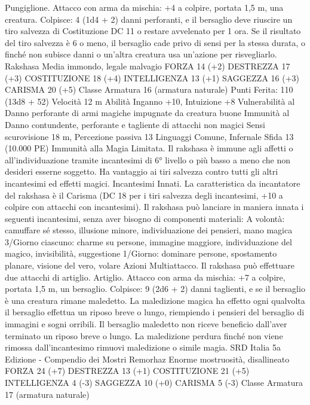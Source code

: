 \begin{multicols}{2}
Pungiglione. Attacco con arma da mischia: +4 a colpire, portata
1,5 m, una creatura.
Colpisce: 4 (1d4 + 2) danni perforanti, e il bersaglio deve
riuscire un tiro salvezza di Costituzione DC 11 o restare
avvelenato per 1 ora. Se il risultato del tiro salvezza è 6 o meno,
il bersaglio cade privo di sensi per la stessa durata, o finché non
subisce danni o un’altra creatura usa un’azione per risvegliarlo.
Rakshasa
Media immondo, legale malvagio
FORZA 14 (+2)
DESTREZZA 17 (+3)
COSTITUZIONE 18 (+4)
INTELLIGENZA 13 (+1)
SAGGEZZA 16 (+3)
CARISMA 20 (+5)
Classe Armatura 16 (armatura naturale)
\hspace*{0pt}\hfill{Punti Ferita}: 110 (13d8 + 52)
Velocità 12 m
Abilità Inganno +10, Intuizione +8
Vulnerabilità al Danno perforante di armi magiche impugnate
da creatura buone
Immunità al Danno contundente, perforante e tagliente di
attacchi non magici
Sensi scurovisione 18 m, Percezione passiva 13
Linguaggi Comune, Infernale
Sfida 13 (10.000 PE)
Immunità alla Magia Limitata. Il rakshasa è immune agli affetti
o all’individuazione tramite incantesimi di 6° livello o più basso
a meno che non desideri esserne soggetto. Ha vantaggio ai tiri
salvezza contro tutti gli altri incantesimi ed effetti magici.
Incantesimi Innati. La caratteristica da incantatore del rakshasa
è il Carisma (DC 18 per i tiri salvezza degli incantesimi, +10 a
colpire con attacchi con incantesimi). Il rakshasa può lanciare in
maniera innata i seguenti incantesimi, senza aver bisogno di
componenti materiali:
A volontà: camuffare sé stesso, illusione minore, individuazione
dei pensieri, mano magica
3/Giorno ciascuno: charme su persone, immagine maggiore,
individuazione del magico, invisibilità, suggestione
1/Giorno: dominare persone, spostamento planare, visione del
vero, volare
Azioni
Multiattacco. Il rakshasa può effettuare due attacchi di artiglio.
Artiglio. Attacco con arma da mischia: +7 a colpire, portata 1,5
m, un bersaglio.
Colpisce: 9 (2d6 + 2) danni taglienti, e se il bersaglio è una
creatura rimane maledetto. La maledizione magica ha effetto
ogni qualvolta il bersaglio effettua un riposo breve o lungo,
riempiendo i pensieri del bersaglio di immagini e sogni orribili.
Il bersaglio maledetto non riceve beneficio dall’aver terminato
un riposo breve o lungo. La maledizione perdura finché non
viene rimossa dall’incantesimo rimuovi maledizione o simile
magia.
SRD Italia 5a Edizione - Compendio dei Mostri
Remorhaz
Enorme mostruosità, disallineato
FORZA 24 (+7)
DESTREZZA 13 (+1)
COSTITUZIONE 21 (+5)
INTELLIGENZA 4 (-3)
SAGGEZZA 10 (+0)
CARISMA 5 (-3)
Classe Armatura 17 (armatura naturale)

\end{multicols}
